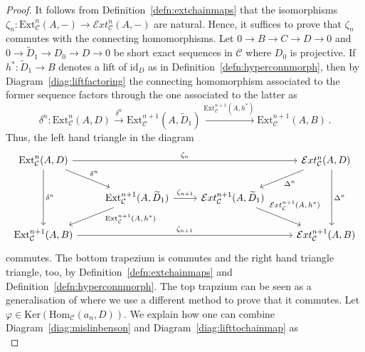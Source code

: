 \documentclass[12pt,a4paper]{article}
\numberwithin{equation}{section}
\theoremstyle{nonumberplain}
\newtheorem{proof}{Proof}
\begin{document}
\begin{proof}
It follows from Definition~\ref{defn:extchainmaps} that the isomorphisms $\zeta_n: \mathrm{Ext}_{\mathcal{C}}^n(A, -) \rightarrow \mathcal{E}xt_{\mathcal{C}}^n(A, -)$ are natural. Hence, it suffices to prove that $\zeta_n$ commutes with the connecting homomorphisms. Let $0 \rightarrow B \rightarrow C \rightarrow D \rightarrow 0$ and $0 \rightarrow \widetilde{D}_1 \rightarrow D_0 \rightarrow D \rightarrow 0$ be short exact sequences in $\mathcal{C}$ where $D_0$ is projective. If $h^{\ast}: \widetilde{D}_1 \rightarrow B$ denotes a lift of $\mathrm{id}_D$ as in Definition~\ref{defn:hyperconnmorph}, then by Diagram~\ref{diag:liftfactoring} the connecting homomorphism associated to the former sequence factors through the one associated to the latter as
\[ \delta^n: \mathrm{Ext}_{\mathcal{C}}^n(A, D) \xrightarrow{\delta^n} \mathrm{Ext}_{\mathcal{C}}^{n+1}(A, \widetilde{D}_1) \xrightarrow{\mathrm{Ext}_{\mathcal{C}}^{n+1}(A, h^{\ast})} \mathrm{Ext}_{\mathcal{C}}^{n+1}(A, B) \, . \]
Thus, the left hand triangle in the diagram
\begin{equation}\label{diag:trapezia}
\begin{tikzcd}
  \mathrm{Ext}_{\mathcal{C}}^n(A{,} \, D) \arrow[rrr, "\zeta_n"] \arrow[dr, "\delta^n"] \arrow[dd, "\delta^n"]
    & & & \mathcal{E}xt_{\mathcal{C}}^n(A{,} \, D) \arrow[dl, "\Delta^n"] \arrow[dd, shift left = 2mm, "\Delta^n"] \\
  & \mathrm{Ext}_{\mathcal{C}}^{n+1}(A{,} \, \widetilde{D}_1) \arrow[r, "\zeta_{n+1}"] \arrow[dl, "\mathrm{Ext}_{\mathcal{C}}^{n+1}(A{,} \, h^{\ast})" near start]
    & \mathcal{E}xt_{\mathcal{C}}^{n+1}(A{,} \, \widetilde{D}_1) \arrow[dr, "\mathcal{E}xt_{\mathcal{C}}^{n+1}(A{,} \, h^{\ast})" near start] & \\
  \mathrm{Ext}_{\mathcal{C}}^{n+1}(A{,} \, B) \arrow[rrr, "\zeta_{n+1}"]
    & & & \mathcal{E}xt_{\mathcal{C}}^{n+1}(A{,} \, B)
\end{tikzcd}
\end{equation}
commutes. The bottom trapezium is commutes and the right hand triangle triangle, too, by Definition~\ref{defn:extchainmaps} and Definition~\ref{defn:hyperconnmorph}. The top trapzium can be seen as a generalisation of \cite[Proposition~1.1]{emm17} where we use a different method to prove that it commutes. Let $\varphi \in \mathrm{Ker}(\mathrm{Hom}_{\mathcal{C}}(a_n, D))$. We explain how one can combine Diagram~\ref{diag:mislinbenson} and Diagram~\ref{diag:lifttochainmap} as
\begin{equation}\label{diag:zetanddelta}

\end{equation}
\end{proof}
\end{document}
